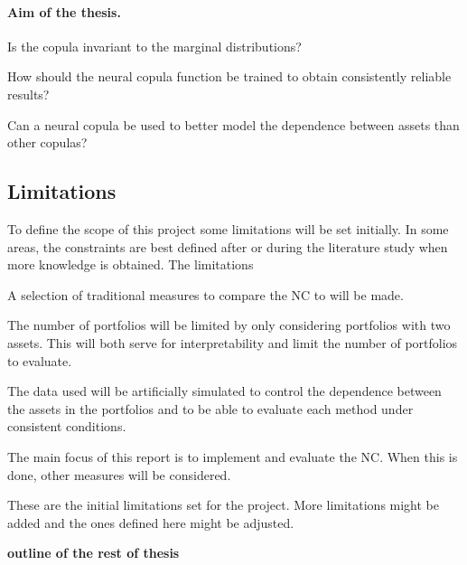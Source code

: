 \paragraph*{Aim of the thesis.}
\begin{compactenum}[{\bfseries RQ}1]
    \item \label{item:RQ1} Is the copula invariant to the marginal distributions?
    \item \label{item:RQ2} How should the neural copula function be trained to obtain consistently reliable results?
    \item \label{item:RQ3} Can a neural copula be used to better model the dependence between assets than other copulas?
    
\end{compactenum}
\newcommand{\RQone}{{\bfseries RQ}\ref{item:RQ1}}
\newcommand{\RQtwo}{{\bfseries RQ}\ref{item:RQ2}}
\newcommand{\RQthree}{{\bfseries RQ}\ref{item:RQ3}}


\subsection{Limitations}
To define the scope of this project some limitations will be set initially. In some areas, the constraints are best defined after or during the literature study when more knowledge is obtained. The limitations 


\begin{compactenum}
    \item A selection of traditional measures to compare the \gls{NC} to will be made. 

    \item The number of portfolios will be limited by only considering portfolios with two assets. This will both serve for interpretability and limit the number of portfolios to evaluate. 

    \item The data used will be artificially simulated to control the dependence between the assets in the portfolios and to be able to evaluate each method under consistent conditions. 

    \item The main focus of this report is to implement and evaluate the \gls{NC}. When this is done, other measures will be considered. 
    
\end{compactenum}

These are the initial limitations set for the project. More limitations might be added and the ones defined here might be adjusted.   










\textbf{outline of the rest of thesis} 